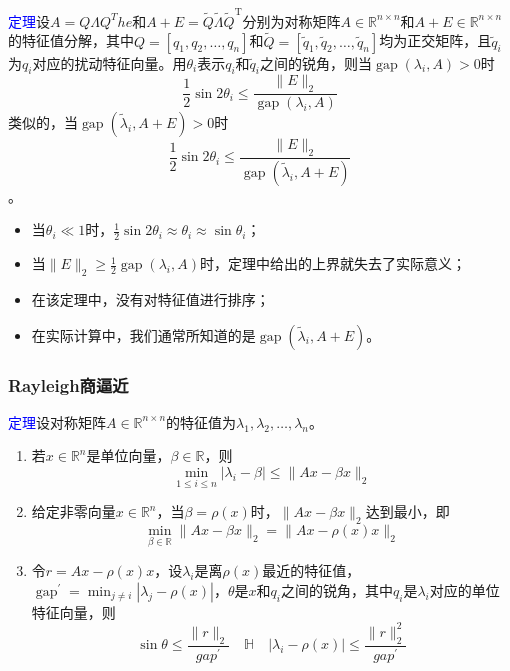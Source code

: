 \documentclass[12pt,a4paper]{article}
\begin{document}
\textcolor{blue}{定理}\quad 设$A=Q\Lambda Q^The$和$A+E=\tilde{Q} \tilde{\Lambda} \tilde{Q}^{\mathrm{T}}$分别为对称矩阵$A \in \mathbb{R}^{n \times n}$和$A+E \in \mathbb{R}^{n \times n}$的特征值分解，其中$Q=\left[q_{1}, q_{2}, \ldots, q_{n}\right]$和$\tilde{Q}=\left[\tilde{q}_{1}, \tilde{q}_{2}, \ldots, \tilde{q}_{n}\right]$均为正交矩阵，且$\tilde{q}_{i}$为$q_{i}$对应的扰动特征向量。用$\theta_i$表示$q_{i}$和$\tilde{q}_{i}$之间的锐角，则当$\operatorname{gap}\left(\lambda_{i}, A\right)>0$时$$
\frac{1}{2} \sin 2 \theta_{i} \leq \frac{\|E\|_{2}}{\operatorname{gap}\left(\lambda_{i}, A\right)}
$$类似的，当$\operatorname{gap}\left(\tilde{\lambda}_{i}, A+E\right)>0$时$$
\frac{1}{2} \sin 2 \theta_{i} \leq \frac{\|E\|_{2}}{\operatorname{gap}\left(\tilde{\lambda}_{i}, A+E\right)}
$$。
\begin{itemize}
	\item 当$\theta_{i} \ll 1$时，$\frac{1}{2} \sin 2 \theta_{i} \approx \theta_{i} \approx \sin \theta_{i}$；
	\item 当$\|E\|_{2} \geq \frac{1}{2} \operatorname{gap}\left(\lambda_{i}, A\right)$时，定理中给出的上界就失去了实际意义；
	\item 在该定理中，没有对特征值进行排序；
	\item 在实际计算中，我们通常所知道的是$\operatorname{gap}\left(\tilde{\lambda}_{i}, A+E\right)$。
\end{itemize}
\subsubsection{Rayleigh商逼近}
\textcolor{blue}{定理}\quad 设对称矩阵$A \in \mathbb{R}^{n \times n}$的特征值为$\lambda_{1}, \lambda_{2}, \ldots, \lambda_{n}$。
\begin{enumerate}[(1)]
	\item 若$x \in \mathbb{R}^{n}$是单位向量，$\beta \in \mathbb{R}$，则\begin{equation}
	\min _{1 \leq i \leq n}\left|\lambda_{i}-\beta\right| \leq\|A x-\beta x\|_{2}
	\label{equation5.15}
	\end{equation}
	\item 给定非零向量$x \in \mathbb{R}^{n}$，当$\beta=\rho(x)$时，$\|A x-\beta x\|_{2}$达到最小，即\begin{equation}
	\min _{\beta \in \mathbb{R}}\|A x-\beta x\|_{2}=\|A x-\rho(x) x\|_{2}
\label{equation5.16}
	\end{equation}
	\item 令$r=A x-\rho(x) x$，设$\lambda_{i}$是离$\rho(x)$最近的特征值，$\operatorname{gap}^{\prime}=\min _{j \neq i} | \lambda_{j}-\rho(x) |$，$\theta$是$x$和$q_i$之间的锐角，其中$q_i$是$\lambda_{i}$对应的单位特征向量，则\begin{equation}
	\sin \theta \leq \frac{\|r\|_{2}}{g a p^{\prime}} \quad \mathbb{H} \quad\left|\lambda_{i}-\rho(x)\right| \leq \frac{\|r\|_{2}^{2}}{g a p^{\prime}}
	\label{equation5.17}
	\end{equation}
\end{enumerate}
\end{document}
